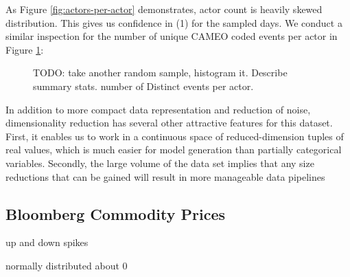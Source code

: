 As Figure \ref{fig:actors-per-actor} demonstrates, actor count is heavily skewed distribution. This gives us confidence in (1) for the sampled days. We conduct a similar inspection for the number of unique CAMEO coded events per actor in Figure \ref{fig:events-per-actor}:

\begin{figure}[ht]
\vskip 0.2in
\begin{center}
\caption{TODO: take another random sample, histogram it. Describe summary stats. number of Distinct events per actor.}
\end{center}
\vskip -0.2in
\label{fig:events-per-actor}
\end{figure} 

In addition to more compact data representation and reduction of noise, dimensionality reduction has several other attractive features for this dataset. First, it enables us to work in a continuous space of reduced-dimension tuples of real values, which is much easier for model generation than partially categorical variables. Secondly, the large volume of the data set implies that any size reductions that can be gained will result in more manageable data pipelines

\subsection{Bloomberg Commodity Prices}

up and down spikes

normally distributed about 0